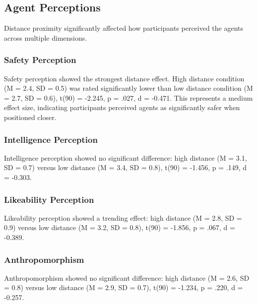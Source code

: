 \documentclass[12pt]{article}
\begin{document}
\subsection{Agent Perceptions}

Distance proximity significantly affected how participants perceived the agents across multiple dimensions.

\subsubsection{Safety Perception}

Safety perception showed the strongest distance effect. High distance condition (M = 2.4, SD = 0.5) was rated significantly lower than low distance condition (M = 2.7, SD = 0.6), t(90) = -2.245, p = .027, d = -0.471. This represents a medium effect size, indicating participants perceived agents as significantly safer when positioned closer.


\subsubsection{Intelligence Perception}

Intelligence perception showed no significant difference: high distance (M = 3.1, SD = 0.7) versus low distance (M = 3.4, SD = 0.8), t(90) = -1.456, p = .149, d = -0.303.

\subsubsection{Likeability Perception}

Likeability perception showed a trending effect: high distance (M = 2.8, SD = 0.9) versus low distance (M = 3.2, SD = 0.8), t(90) = -1.856, p = .067, d = -0.389.

\subsubsection{Anthropomorphism}

Anthropomorphism showed no significant difference: high distance (M = 2.6, SD = 0.8) versus low distance (M = 2.9, SD = 0.7), t(90) = -1.234, p = .220, d = -0.257.
\end{document}
